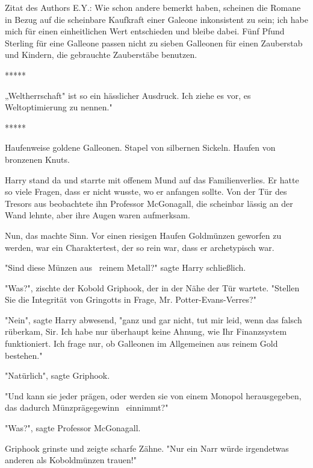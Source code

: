 

\hypertarget{die-hypothese-des-effizienten-marktes}{%

Zitat des Authors E.Y.: Wie schon andere bemerkt haben, scheinen die Romane in Bezug auf die scheinbare Kaufkraft einer Galeone inkonsistent zu sein; ich habe mich für einen einheitlichen Wert entschieden und bleibe dabei. Fünf Pfund Sterling für eine Galleone passen nicht zu sieben Galleonen für einen Zauberstab und Kindern, die gebrauchte Zauberstäbe benutzen. ~

*****

„Weltherrschaft" ist so ein hässlicher Ausdruck. Ich ziehe es vor, es Weltoptimierung zu nennen." ~

*****

Haufenweise goldene Galleonen. Stapel von silbernen Sickeln. Haufen von bronzenen Knuts.

Harry stand da und starrte mit offenem Mund auf das Familienverlies. Er hatte so viele Fragen, dass er nicht wusste, wo er anfangen sollte. Von der Tür des Tresors aus beobachtete ihn Professor McGonagall, die scheinbar lässig an der Wand lehnte, aber ihre Augen waren aufmerksam.

Nun, das machte Sinn. Vor einen riesigen Haufen Goldmünzen geworfen zu werden, war ein Charaktertest, der so rein war, dass er archetypisch war.

"Sind diese Münzen aus ~reinem Metall?" sagte Harry schließlich.

"Was?", zischte der Kobold Griphook, der in der Nähe der Tür wartete. "Stellen Sie die Integrität von Gringotts in Frage, Mr. Potter-Evans-Verres?"

"Nein", sagte Harry abwesend, "ganz und gar nicht, tut mir leid, wenn das falsch rüberkam, Sir. Ich habe nur überhaupt keine Ahnung, wie Ihr Finanzsystem funktioniert. Ich frage nur, ob Galleonen im Allgemeinen aus reinem Gold bestehen."

"Natürlich", sagte Griphook.

"Und kann sie jeder prägen, oder werden sie von einem Monopol herausgegeben, das dadurch Münzprägegewinn ~einnimmt?"

"Was?", sagte Professor McGonagall.

Griphook grinste und zeigte scharfe Zähne. "Nur ein Narr würde irgendetwas anderen als Koboldmünzen trauen!"

}
